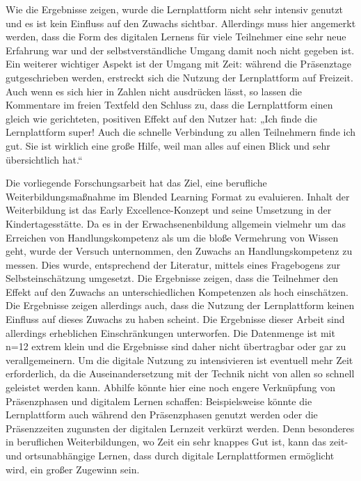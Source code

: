 \documentclass[12pt,smallheadings, bibliography=totoc]{scrartcl}
\begin{document}
Wie die Ergebnisse zeigen, wurde die Lernplattform nicht sehr intensiv
genutzt und es ist kein Einfluss auf den Zuwachs sichtbar. Allerdings
muss hier angemerkt werden, dass die Form des digitalen Lernens für
viele Teilnehmer eine sehr neue Erfahrung war und der
selbstverständliche Umgang damit noch nicht gegeben ist. Ein weiterer
wichtiger Aspekt ist der Umgang mit Zeit: während die Präsenztage
gutgeschrieben werden, erstreckt sich die Nutzung der Lernplattform auf
Freizeit. Auch wenn es sich hier in Zahlen nicht ausdrücken lässt, so
lassen die Kommentare im freien Textfeld den Schluss zu, dass die
Lernplattform einen gleich wie gerichteten, positiven Effekt auf den
Nutzer hat: „Ich finde die Lernplattform super! Auch die schnelle
Verbindung zu allen Teilnehmern finde ich gut. Sie ist wirklich eine
große Hilfe, weil man alles auf einen Blick und sehr übersichtlich
hat.``

Die vorliegende Forschungsarbeit hat das Ziel, eine berufliche
Weiterbildungsmaßnahme im Blended Learning Format zu evaluieren. Inhalt
der Weiterbildung ist das Early Excellence-Konzept und seine Umsetzung
in der Kindertagesstätte. Da es in der Erwachsenenbildung allgemein
vielmehr um das Erreichen von Handlungskompetenz als um die bloße
Vermehrung von Wissen geht, wurde der Versuch unternommen, den Zuwachs
an Handlungskompetenz zu messen. Dies wurde, entsprechend der Literatur,
mittels eines Fragebogens zur Selbsteinschätzung umgesetzt. Die
Ergebnisse zeigen, dass die Teilnehmer den Effekt auf den Zuwachs an
unterschiedlichen Kompetenzen als hoch einschätzen. Die Ergebnisse
zeigen allerdings auch, dass die Nutzung der Lernplattform keinen
Einfluss auf dieses Zuwachs zu haben scheint. Die Ergebnisse dieser
Arbeit sind allerdings erheblichen Einschränkungen unterworfen. Die
Datenmenge ist mit n=12 extrem klein und die Ergebnisse sind daher nicht
übertragbar oder gar zu verallgemeinern. Um die digitale Nutzung zu
intensivieren ist eventuell mehr Zeit erforderlich, da die
Auseinandersetzung mit der Technik nicht von allen so schnell geleistet
werden kann. Abhilfe könnte hier eine noch engere Verknüpfung von
Präsenzphasen und digitalem Lernen schaffen: Beispielsweise könnte die
Lernplattform auch während den Präsenzphasen genutzt werden oder die
Präsenzzeiten zugunsten der digitalen Lernzeit verkürzt werden. Denn
besonderes in beruflichen Weiterbildungen, wo Zeit ein sehr knappes Gut
ist, kann das zeit- und ortsunabhängige Lernen, dass durch digitale
Lernplattformen ermöglicht wird, ein großer Zugewinn sein.
\end{document}
